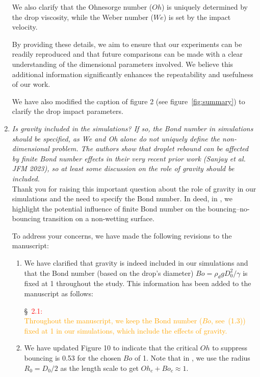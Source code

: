 \documentclass[]{article}
\newcommand*\red{\textcolor{red}}
\newcommand{\VS}[1]{{\textcolor{orange}{#1}}}
\begin{document}
\begin{enumerate}
	We also clarify that the Ohnesorge number ($Oh$) is uniquely determined by the drop viscosity, while the Weber number ($We$) is set by the impact velocity.

	By providing these details, we aim to ensure that our experiments can be readily reproduced and that future comparisons can be made with a clear understanding of the dimensional parameters involved. We believe this additional information significantly enhances the repeatability and usefulness of our work.
	
	We have also modified the caption of figure 2 (see figure~\ref{fig:summary}) to clarify the drop impact parameters. 
		
	\item \textit{Is gravity included in the simulations? If so, the Bond number in simulations should be specified, as We and Oh alone do not uniquely define the non-dimensional problem. The authors show that droplet rebound can be affected by finite Bond number effects in their very recent prior work (Sanjay et al. JFM 2023), so at least some discussion on the role of gravity should be included.}\\[0.5mm]
	
	Thank you for raising this important question about the role of gravity in our simulations and the need to specify the Bond number. In deed, in \citet{sanjay_chantelot_lohse_2023}, we highlight the potential influence of finite Bond number on the bouncing--no-bouncing transition on a non-wetting surface. 
	
	To address your concerns, we have made the following revisions to the manuscript:
	
	\begin{enumerate}
		\item We have clarified that gravity is indeed included in our simulations and that the Bond number (based on the drop's diameter) $Bo = \rho_dgD_0^2/\gamma$ is fixed at 1 throughout the study. This information has been added to the manuscript as follows:
		
		\S~\red{2.1:}\\
		\VS{Throughout the manuscript, we keep the Bond number ($Bo$, see~(1.3)) fixed at 1 in our simulations, which include the effects of gravity.}
		
		\item We have updated Figure 10 to indicate that the critical $Oh$ to suppress bouncing is 0.53 for the chosen $Bo$ of 1. Note that in \citet{sanjay_chantelot_lohse_2023}, we use the radius $R_0 = D_0/2$ as the length scale to get $Oh_c + Bo_c \approx 1$. 
		

\end{enumerate}
\end{enumerate}
\end{document}
